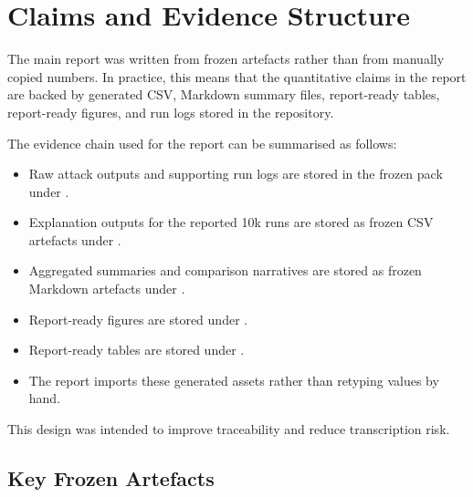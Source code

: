 \documentclass[11pt,a4paper]{report}
\begin{document}
\chapter{Claims and Evidence Structure}

The main report was written from frozen artefacts rather than from manually copied numbers.
In practice, this means that the quantitative claims in the report are backed by generated CSV,
Markdown summary files, report-ready tables, report-ready figures, and run logs stored in the
repository.

The evidence chain used for the report can be summarised as follows:

\begin{itemize}
  \item Raw attack outputs and supporting run logs are stored in the frozen pack under .
  \item Explanation outputs for the reported 10k runs are stored as frozen CSV artefacts under .
  \item Aggregated summaries and comparison narratives are stored as frozen Markdown artefacts under .
  \item Report-ready figures are stored under .
  \item Report-ready tables are stored under .
  \item The report imports these generated assets rather than retyping values by hand.
\end{itemize}

This design was intended to improve traceability and reduce transcription risk.

\section*{Key Frozen Artefacts}
\end{document}
